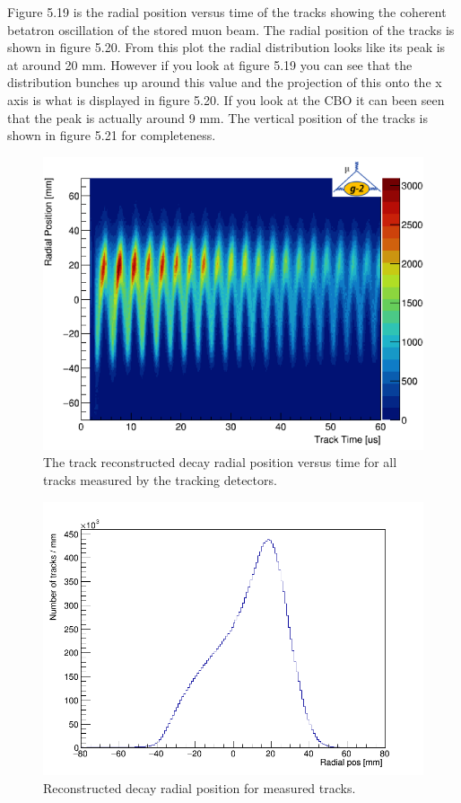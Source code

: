 Figure 5.19 is the radial position versus time of the tracks showing the coherent betatron oscillation of the stored muon beam. The radial position of the tracks is shown in figure 5.20. From this plot the radial distribution looks like its peak is at around 20 mm. However if you look at figure 5.19 you can see that the distribution bunches up around this value and the projection of this onto the x axis is what is displayed in figure 5.20. If you look at the CBO it can been seen that the peak is actually around 9 mm. The vertical position of the tracks is shown in figure 5.21 for completeness.

\begin{figure}[th]
\centering
\includegraphics[scale=0.9]{Figures/trackercbo.png}
\decoRule
\caption{The track reconstructed decay radial position versus time for all tracks measured by the tracking detectors.}
\label{fig:trackercbo}
\end{figure}

\begin{figure}[th]
\centering
\includegraphics[scale=0.4]{Figures/RadialPosition_.png}
\decoRule
\caption{Reconstructed decay radial position for measured tracks.}
\label{fig:RadialPosition_}
\end{figure}

